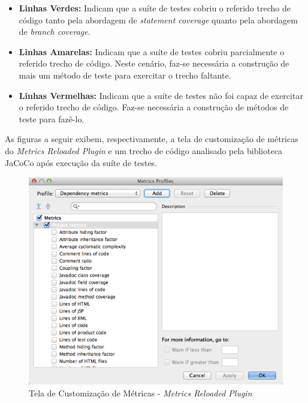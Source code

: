 \begin{itemize}
	\item \textbf{Linhas Verdes:} Indicam que a suíte de testes cobriu o referido trecho de código tanto pela abordagem de \textit{statement coverage} quanto pela abordagem de \textit{branch coverage}.

	\item \textbf{Linhas Amarelas:} Indicam que a suíte de testes cobriu parcialmente o referido trecho de código. Neste cenário, faz-se necessária a construção de mais um método de teste para exercitar o trecho faltante.

	\item \textbf{Linhas Vermelhas:} Indicam que a suíte de testes não foi capaz de exercitar o referido trecho de código. Faz-se necessária a construção de métodos de teste para fazê-lo.
\end{itemize}

As figuras a seguir exibem, respectivamente, a tela de customização de métricas do \textit{Metrics Reloaded Plugin} e um trecho de código analisado pela biblioteca JaCoCo após execução da suíte de testes.

\begin{figure}[!h]
\includegraphics[width=\textwidth]{figuras/metricsReloaded.png}
\caption{Tela de Customização de Métricas - \textit{Metrics Reloaded Plugin}}
\end{figure}

